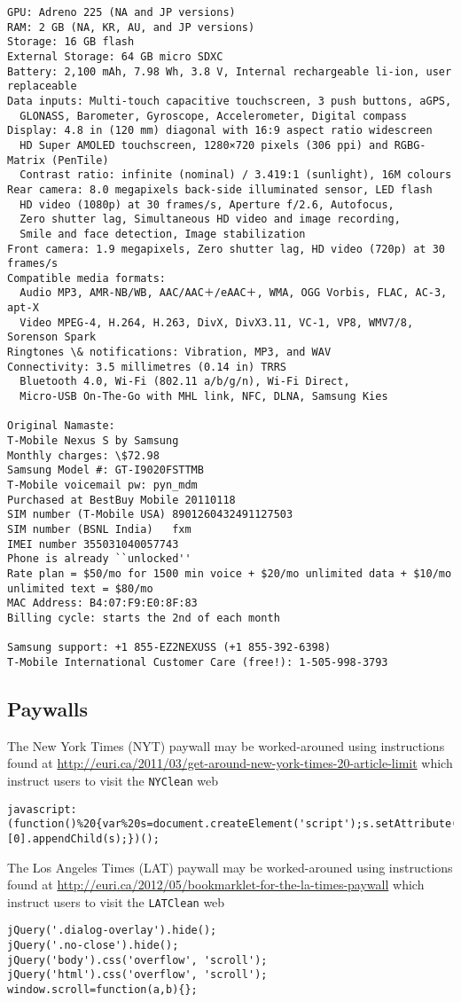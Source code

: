 \documentclass[12pt,twoside]{article}
\begin{document}
\begin{verbatim}
GPU: Adreno 225 (NA and JP versions)
RAM: 2 GB (NA, KR, AU, and JP versions)
Storage: 16 GB flash
External Storage: 64 GB micro SDXC
Battery: 2,100 mAh, 7.98 Wh, 3.8 V, Internal rechargeable li-ion, user replaceable
Data inputs: Multi-touch capacitive touchscreen, 3 push buttons, aGPS,
  GLONASS, Barometer, Gyroscope, Accelerometer, Digital compass
Display: 4.8 in (120 mm) diagonal with 16:9 aspect ratio widescreen
  HD Super AMOLED touchscreen, 1280×720 pixels (306 ppi) and RGBG-Matrix (PenTile)
  Contrast ratio: infinite (nominal) / 3.419:1 (sunlight), 16M colours
Rear camera: 8.0 megapixels back-side illuminated sensor, LED flash
  HD video (1080p) at 30 frames/s, Aperture f/2.6, Autofocus, 
  Zero shutter lag, Simultaneous HD video and image recording,
  Smile and face detection, Image stabilization
Front camera: 1.9 megapixels, Zero shutter lag, HD video (720p) at 30 frames/s
Compatible media formats:
  Audio MP3, AMR-NB/WB, AAC/AAC＋/eAAC＋, WMA, OGG Vorbis, FLAC, AC-3, apt-X
  Video MPEG-4, H.264, H.263, DivX, DivX3.11, VC-1, VP8, WMV7/8, Sorenson Spark
Ringtones \& notifications: Vibration, MP3, and WAV
Connectivity: 3.5 millimetres (0.14 in) TRRS
  Bluetooth 4.0, Wi-Fi (802.11 a/b/g/n), Wi-Fi Direct, 
  Micro-USB On-The-Go with MHL link, NFC, DLNA, Samsung Kies

Original Namaste:
T-Mobile Nexus S by Samsung
Monthly charges: \$72.98
Samsung Model #: GT-I9020FSTTMB
T-Mobile voicemail pw: pyn_mdm
Purchased at BestBuy Mobile 20110118
SIM number (T-Mobile USA) 8901260432491127503 
SIM number (BSNL India)   fxm
IMEI number 355031040057743
Phone is already ``unlocked''
Rate plan = $50/mo for 1500 min voice + $20/mo unlimited data + $10/mo unlimited text = $80/mo
MAC Address: B4:07:F9:E0:8F:83
Billing cycle: starts the 2nd of each month

Samsung support: +1 855-EZ2NEXUSS (+1 855-392-6398)
T-Mobile International Customer Care (free!): 1-505-998-3793
\end{verbatim}

\subsection{Paywalls}\label{sxn:pyw}
The New York Times (NYT) paywall may be worked-arouned using
instructions found at
\url{http://euri.ca/2011/03/get-around-new-york-times-20-article-limit} 
which instruct users to visit the \texttt{NYClean} web 
\begin{verbatim}
javascript:(function()%20{var%20s=document.createElement('script');s.setAttribute('src','http://toys.euri.ca/nyt.js');document.getElementsByTagName('head')[0].appendChild(s);})();
\end{verbatim}
The Los Angeles Times (LAT) paywall may be worked-arouned using
instructions found at
\url{http://euri.ca/2012/05/bookmarklet-for-the-la-times-paywall}
which instruct users to visit the \texttt{LATClean} web 
\begin{verbatim}
jQuery('.dialog-overlay').hide();
jQuery('.no-close').hide();
jQuery('body').css('overflow', 'scroll');
jQuery('html').css('overflow', 'scroll');
window.scroll=function(a,b){};
\end{verbatim}
\end{document}
